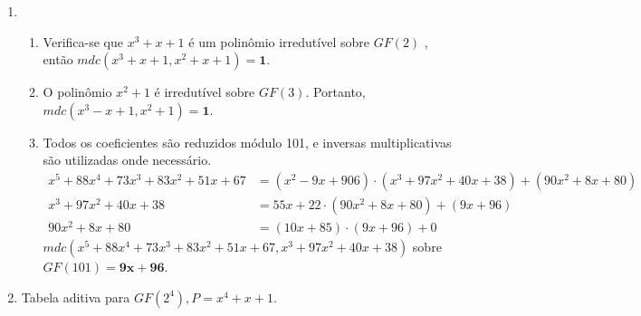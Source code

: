 \documentclass[fleqn]{article}
\begin{document}
\begin{enumerate}[label=\textbf{\arabic*})]
\begin{enumerate}
\end{enumerate}

\item

\begin{enumerate}

\item Verifica-se que $x^3 + x + 1$ é um polinômio irredutível sobre $GF(2)$
\cite{Stallings:2002:CNS:599893}, então $mdc(x^3 + x + 1, x^2 + x + 1) =
\boldsymbol{1}$.

\item O polinômio $x^2 + 1$ é irredutível sobre $GF(3)$. Portanto,
$mdc(x^3 - x + 1, x^2 + 1) = \boldsymbol{1}$.

\item Todos os coeficientes são reduzidos módulo 101, e inversas
multiplicativas são utilizadas onde necessário.
\begin{align*}
x^5 + 88x^4 + 73x^3 + 83x^2 + 51x + 67 &= (x^2 - 9x + 906) \cdot
(x^3 + 97x^2 + 40x + 38) + (90x^2 + 8x + 80) \\
x^3 + 97x^2 + 40x + 38 &= 55x + 22 \cdot (90x^2 + 8x + 80) + (9x + 96) \\
90x^2 + 8x + 80 &= (10x + 85) \cdot (9x + 96) + 0
\end{align*}
$mdc(x^5 + 88x^4 + 73x^3 + 83x^2 + 51x + 67, x^3 + 97x^2 + 40x + 38)$ sobre
$GF(101) = \boldsymbol{9x + 96}$.

\end{enumerate}

\newpage

\item Tabela aditiva para $GF(2^4), P = x^4 + x + 1$.


\end{enumerate}
\end{document}
